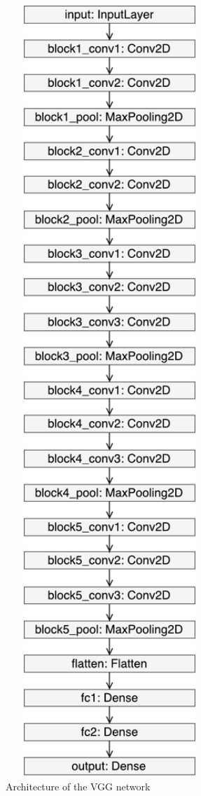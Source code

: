 \begin{figure}
\begin{minipage}{0.4\textwidth}
            \includegraphics[width=0.7\textwidth]{fig/vgg_keras.pdf}
            \caption{Architecture of the VGG network}
            \label{vgg:architecture}
    \end{minipage}
\end{figure}

